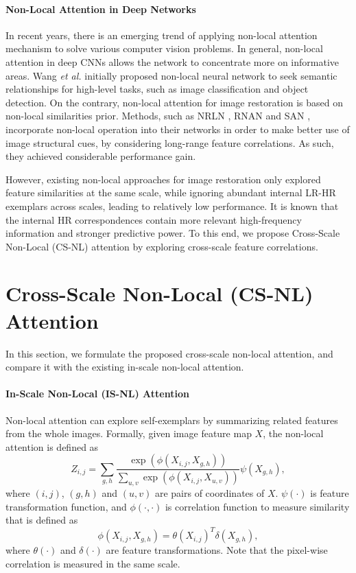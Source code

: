 \documentclass[10pt,twocolumn,letterpaper]{article}
\begin{document}
\paragraph{Non-Local Attention in Deep Networks}
In recent years, there is an emerging trend of applying non-local attention mechanism to solve various computer vision problems. In general, non-local attention in deep CNNs allows the network to concentrate more on informative areas. Wang \textit{et al.} \cite{wang2018non} initially proposed non-local neural network to seek semantic relationships for high-level tasks, such as image classification and object detection. On the contrary, non-local attention for image restoration is based on non-local similarities prior. Methods, such as NRLN \cite{liu2018non}, RNAN \cite{zhang2018image} and SAN \cite{dai2019second}, incorporate non-local operation into their networks in order to make better use of image structural cues, by considering long-range feature correlations. As such, they achieved considerable performance gain.

However, existing non-local approaches for image restoration only explored feature similarities at the same scale, while ignoring abundant internal LR-HR exemplars across scales, leading to relatively low performance. It is known that the internal HR correspondences contain more relevant high-frequency information and stronger predictive power. To this end, we propose Cross-Scale Non-Local (CS-NL) attention by exploring cross-scale feature correlations. 


 \section{Cross-Scale Non-Local (CS-NL) Attention}\label{sec:csnl}

In this section, we formulate the proposed cross-scale non-local attention, and compare it with the existing in-scale non-local attention. 
\paragraph{In-Scale Non-Local (IS-NL) Attention}
Non-local attention can explore self-exemplars by summarizing related features from the whole images.
Formally, given image feature map $X$, the non-local attention is defined as
\begin{equation}
    \label{eq:nla}
    Z_{i, j} = \sum_{g, h}
    \frac{\exp(\phi(X_{i, j}, X_{g, h}))}{\sum_{u, v}\exp(\phi(X_{i, j}, X_{u, v}))}
    \psi(X_{g, h}),
\end{equation}
where $(i, j)$, $(g, h)$ and $(u, v)$ are pairs of coordinates of $X$. $\psi(\cdot)$ is feature transformation function, and $\phi(\cdot,\cdot)$ is correlation function to measure similarity that is defined as
\begin{equation}
    \label{eq:phi}
    \phi(X_{i, j}, X_{g, h}) = \theta(X_{i,j})^T\delta(X_{g, h}),
\end{equation}
where $\theta(\cdot)$ and $\delta(\cdot)$ are feature transformations. Note that the pixel-wise correlation is measured in the same scale.
\end{document}
